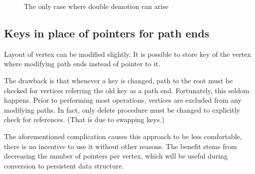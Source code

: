 \begin{figure}
\begin{center}
\qquad
{}
\qquad
{}
\qquad
{}
\end{center}
\caption{The only case where double demotion can arise}
\end{figure}

\subsection{Keys in place of pointers for path ends}

Layout of vertex can be modified slightly. It is possible to store key of the vertex where modifying path ends instead of pointer to it.

The drawback is that whenever a key is changed, path to the root must be checked for vertices referring the old key as a path end. Fortunately, this seldom happens. Prior to performing most operations, vertices are excluded from any modifying paths. In fact, only delete procedure must be changed to explicitly check for references. (That is due to swapping keys.)

The aforementioned complication causes this approach to be less comfortable, there is no incentive to use it without other reasons. The benefit stems from decreasing the number of pointers per vertex, which will be useful during conversion to persistent data structure.
